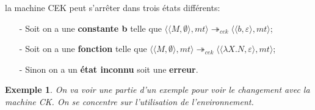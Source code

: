 \documentclass[10pt,a4paper]{report}
\newtheorem{ex}{Exemple}
\begin{document}
	
	la machine CEK peut s'arrêter dans trois états différents:
	\begin{itemize}
		\item[-] Soit on a une \textbf{constante b} telle que $\langle \langle M,\emptyset\rangle,mt\rangle \twoheadrightarrow_{cek} \langle\langle b,\varepsilon\rangle,mt\rangle$;
		\item[-] Soit on a une \textbf{fonction} telle que $\langle \langle M,\emptyset\rangle,mt\rangle \twoheadrightarrow_{cek} \langle\langle \lambda X.N,\varepsilon\rangle,mt\rangle$;
		\item[-] Sinon on a un \textbf{état inconnu} soit une \textbf{erreur}.
	\end{itemize}
	\bigbreak
	
	\begin{ex}
			On va voir une partie d'un exemple pour voir le changement avec la machine CK. On se concentre sur l'utilisation de l'environnement.
		\medbreak
		

\end{ex}
\end{document}
